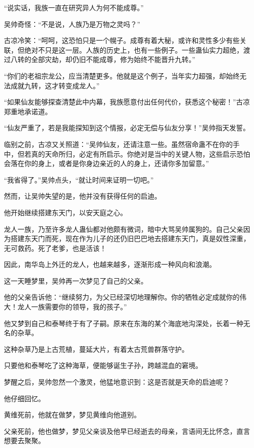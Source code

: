 \begin{this_body}
“说实话，我族一直在研究异人为何不能成尊。”

吴帅奇怪：“不是说，人族乃是万物之灵吗？”

古凉冷笑：“呵呵，这恐怕只是一个幌子。成尊有着大秘，或许和灵性多少有些关联，但绝对不只是这一层。人族的历史上，也有一些例子。一些蛊仙实力超绝，渡过八转的全部灾劫，却仍旧不能成尊，修为始终不能晋升九转。”

“你们的老祖宗龙公，应当清楚更多。他就是这个例子，当年实力超强，却始终无法成就九转，这才转变成龙人。”

“如果仙友能够探查清楚此中内幕，我族愿意付出任何代价，获悉这个秘密！”古凉郑重地承诺道。

“仙友严重了，若是我能探知到这个情报，必定无偿与仙友分享！”吴帅指天发誓。

临别之前，古凉又关照道：“吴帅仙友，还请注意一些。虽然宿命蛊不在你的手中，但若真的天命所归，必定有所启示。你绝对是当中的关键人物，这些启示恐怕会落在你的身上，或者是你身边亲近的人的身上，还请你多加留意。”

“我省得了。”吴帅点头，“就让时间来证明一切吧。”

然而，让吴帅失望的是，他并没有获得任何的启迪。

他开始继续搭建东天门，以安天庭之心。

龙人一族，乃至许多龙人蛊仙都对他颇有微词，暗中大骂吴帅属狗的。自己父亲因为搭建东天门而死，现在作为儿子的还仍旧巴巴地去搭建东天门，真是奴性深重，无可救药。死了老爹，也是活该！

因此，南华岛上外迁的龙人，也越来越多，逐渐形成一种风向和浪潮。

这一天睡梦里，吴帅再一次梦见了自己的父亲。

他的父亲告诉他：“继续努力，为父已经深切地理解你。你的牺牲必定成就你的伟大！龙人一族需要你的领导，我的孩子。”

他又梦到自己和泰琴终于有了子嗣。原来在东海的某个海底地沟深处，长着一种无名的杂草。

这种杂草乃是上古荒植，蔓延大片，有着太古荒兽群落守护。

只要他和泰琴吃了这种海草，便能够诞生子孙，跨越混血的窘境。

梦醒之后，吴帅忽然一个激灵，他猛地意识到：这是否就是天命的启迪呢？

他仔细回忆。

黄维死前，他就在做梦，梦见黄维向他道别。

父亲死前，他也做梦，梦见父亲谈及他早已经逝去的母亲，言语间无比怀念，直言想要去聚聚。


\end{this_body}
